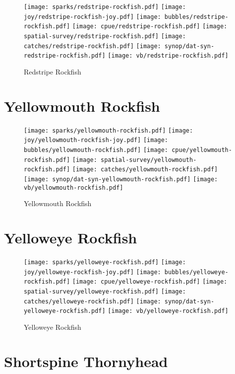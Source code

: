 \begin{figure}[htbp]
\centering
\texttt{[image: sparks/redstripe-rockfish.pdf]}
\texttt{[image: joy/redstripe-rockfish-joy.pdf]}
\texttt{[image: bubbles/redstripe-rockfish.pdf]}
\texttt{[image: cpue/redstripe-rockfish.pdf]}
\texttt{[image: spatial-survey/redstripe-rockfish.pdf]}
\texttt{[image: catches/redstripe-rockfish.pdf]}
\texttt{[image: synop/dat-syn-redstripe-rockfish.pdf]}
\texttt{[image: vb/redstripe-rockfish.pdf]}
\caption{Redstripe Rockfish}
\end{figure}
\clearpage
\section{Yellowmouth Rockfish}

\begin{figure}[htbp]
\centering
\texttt{[image: sparks/yellowmouth-rockfish.pdf]}
\texttt{[image: joy/yellowmouth-rockfish-joy.pdf]}
\texttt{[image: bubbles/yellowmouth-rockfish.pdf]}
\texttt{[image: cpue/yellowmouth-rockfish.pdf]}
\texttt{[image: spatial-survey/yellowmouth-rockfish.pdf]}
\texttt{[image: catches/yellowmouth-rockfish.pdf]}
\texttt{[image: synop/dat-syn-yellowmouth-rockfish.pdf]}
\texttt{[image: vb/yellowmouth-rockfish.pdf]}
\caption{Yellowmouth Rockfish}
\end{figure}
\clearpage
\section{Yelloweye Rockfish}

\begin{figure}[htbp]
\centering
\texttt{[image: sparks/yelloweye-rockfish.pdf]}
\texttt{[image: joy/yelloweye-rockfish-joy.pdf]}
\texttt{[image: bubbles/yelloweye-rockfish.pdf]}
\texttt{[image: cpue/yelloweye-rockfish.pdf]}
\texttt{[image: spatial-survey/yelloweye-rockfish.pdf]}
\texttt{[image: catches/yelloweye-rockfish.pdf]}
\texttt{[image: synop/dat-syn-yelloweye-rockfish.pdf]}
\texttt{[image: vb/yelloweye-rockfish.pdf]}
\caption{Yelloweye Rockfish}
\end{figure}
\clearpage
\section{Shortspine Thornyhead}

